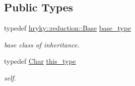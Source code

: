\subsection*{Public Types}
\begin{DoxyCompactItemize}
\item 
\hypertarget{classhryky_1_1reduction_1_1_char_a939ea3c855793d5f5ea142790b165770}{typedef \hyperlink{classhryky_1_1reduction_1_1_base}{hryky\-::reduction\-::\-Base} \hyperlink{classhryky_1_1reduction_1_1_char_a939ea3c855793d5f5ea142790b165770}{base\-\_\-type}}\label{classhryky_1_1reduction_1_1_char_a939ea3c855793d5f5ea142790b165770}

\begin{DoxyCompactList}\small\item\em base class of inheritance. \end{DoxyCompactList}\item 
\hypertarget{classhryky_1_1reduction_1_1_char_a8ecc1228db2c9e792ab105fb88e7df50}{typedef \hyperlink{classhryky_1_1reduction_1_1_char}{Char} \hyperlink{classhryky_1_1reduction_1_1_char_a8ecc1228db2c9e792ab105fb88e7df50}{this\-\_\-type}}\label{classhryky_1_1reduction_1_1_char_a8ecc1228db2c9e792ab105fb88e7df50}

\begin{DoxyCompactList}\small\item\em self. \end{DoxyCompactList}\end{DoxyCompactItemize}

